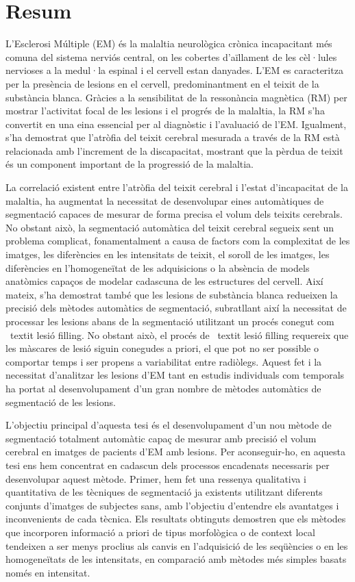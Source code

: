 \chapter*{Resum}


L'Esclerosi Múltiple (EM)  és la malaltia neurològica crònica incapacitant més comuna del sistema nerviós central, on les cobertes d'aïllament de les cèl·lules nervioses a la medul·la espinal i el cervell estan danyades. L'EM es caracteritza per la presència de lesions en el cervell, predominantment en el teixit de la substància blanca. Gràcies a la sensibilitat de la ressonància magnètica (RM) per mostrar l'activitat focal de les lesions i el progrés de la malaltia, la RM s'ha convertit en una eina essencial per al diagnòstic i l'avaluació de l'EM. Igualment, s'ha demostrat que l'atròfia del teixit cerebral mesurada a través de la RM està relacionada amb l'increment de la discapacitat, mostrant que la pèrdua de teixit és un component important de la progressió de la malaltia.

La correlació existent entre l'atròfia del teixit cerebral i l'estat d'incapacitat de la malaltia, ha augmentat la necessitat de desenvolupar
eines automàtiques de segmentació capaces de mesurar de forma precisa el volum dels teixits cerebrals. No obstant això, la segmentació automàtica del teixit cerebral segueix sent un problema complicat, fonamentalment a causa de factors com la complexitat de les imatges, les diferències en les intensitats de teixit, el soroll de les imatges, les diferències en l'homogeneïtat de les adquisicions o la absència de models anatòmics capaços de modelar cadascuna de les estructures del cervell. Així mateix, s'ha demostrat també que les lesions de substància blanca redueixen la precisió dels mètodes automàtics de segmentació, subratllant així la necessitat de processar les lesions abans de la segmentació utilitzant un procés conegut com \ textit {lesió filling}. No obstant això, el procés de \ textit {lesió filling} requereix que les màscares de lesió siguin conegudes a priori, el que pot no ser possible o comportar temps i ser propens a variabilitat entre radiòlegs. Aquest fet i la necessitat d'analitzar les lesions d'EM tant en estudis individuals com temporals ha portat al desenvolupament d'un
gran nombre de mètodes automàtics de segmentació de les lesions.

L'objectiu principal d'aquesta tesi és el desenvolupament d'un nou mètode de segmentació totalment automàtic capaç de mesurar amb precisió el volum cerebral en imatges de pacients d'EM amb lesions. Per aconseguir-ho, en aquesta tesi ens hem concentrat en cadascun dels processos encadenats necessaris per desenvolupar aquest mètode. Primer, hem fet una ressenya qualitativa i quantitativa de les tècniques de segmentació ja existents utilitzant diferents conjunts d'imatges de subjectes sans, amb l'objectiu d'entendre els avantatges i inconvenients de cada tècnica. Els resultats obtinguts demostren que els mètodes que incorporen informació a priori de tipus morfològica o de context local tendeixen a ser menys proclius als canvis en l'adquisició de les seqüències o en les homogeneïtats de les intensitats, en comparació amb mètodes més simples basats només en intensitat.

